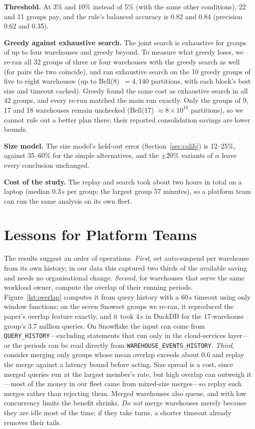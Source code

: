 \documentclass[conference]{IEEEtran}
\begin{document}
\textbf{Threshold.} At 3\% and 10\% instead of 5\% (with the same other conditions), 22 and 11 groups pay, and the rule's
balanced accuracy is 0.82 and 0.84 (precision 0.62 and 0.35).

\textbf{Greedy against exhaustive search.} The joint search is exhaustive for groups of up to four warehouses and greedy beyond. To
measure what greedy loses, we re-ran all 32 groups of three or four warehouses with the greedy search as well (for pairs
the two coincide), and ran exhaustive search on the 10 greedy groups of five to eight warehouses (up to Bell(8)~$=4{,}140$
partitions, with each block's best size and timeout cached). Greedy found the same cost as exhaustive search in all 42
groups, and every re-run matched the main run exactly. Only the groups of 9, 17 and 18 warehouses remain unchecked
(Bell(17) $\approx 8\times10^{10}$ partitions), so we cannot rule out a better plan there; their reported
consolidation savings are lower bounds.

\textbf{Size model.} The size model's held-out error (Section~\ref{sec:calib}) is 12--25\%, against 35--60\% for the simple
alternatives, and the $\pm20\%$ variants of $\alpha$ leave every conclusion unchanged.

\textbf{Cost of the study.} The replay and search took about two hours in total on a laptop (median 0.3\,s per group; the
largest group 57 minutes), so a platform team can run the same analysis on its own fleet.

\section{Lessons for Platform Teams}
The results suggest an order of operations. \emph{First}, set auto-suspend per warehouse from its own history; in our data
this captured two thirds of the available saving and needs no organisational change. \emph{Second}, for warehouses that
serve the same workload owner, compute the overlap of their running periods. Figure~\ref{lst:overlap} computes it from
query history with a 60\,s timeout using only window functions; on the seven Snowset groups we re-ran, it reproduced the
paper's overlap feature exactly, and it took 4\,s in DuckDB for the 17-warehouse group's 3.7 million queries. On Snowflake
the input can come from \texttt{QUERY\_HISTORY}---excluding statements that run only in the cloud-services layer---or the
periods can be read directly from \texttt{WAREHOUSE\_EVENTS\_HISTORY}. \emph{Third}, consider merging only groups whose
mean overlap exceeds about 0.6 and replay the merge against a latency bound before acting. Size spread is a cost, since
merged queries run at the largest member's rate, but high overlap can outweigh it---most of the money in our fleet came
from mixed-size merges---so replay such merges rather than rejecting them. Merged warehouses also queue, and with low
concurrency limits the benefit shrinks. \emph{Do not} merge warehouses merely
because they are idle most of the time; if they take turns, a shorter timeout already removes their tails.
\end{document}
